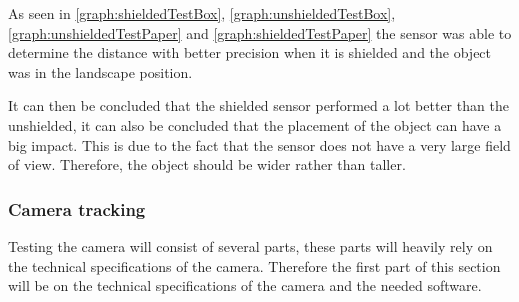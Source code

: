 

As seen in \autoref{graph:shieldedTestBox}, \autoref{graph:unshieldedTestBox},
\autoref{graph:unshieldedTestPaper} and \autoref{graph:shieldedTestPaper} the
sensor was able to determine the distance with better precision when it is
shielded and the object was in the landscape position. \nl

It can then be concluded that the shielded sensor performed a lot better than
the unshielded, it can also be concluded that the placement of the object can
have a big impact. This is due to the fact that the sensor does not have a very
large field of view. Therefore, the object should be wider rather than taller. 

% 
% 

\subsubsection{Camera tracking}%
Testing the camera will consist of several parts, these parts will heavily rely
on the technical specifications of the camera. Therefore the first part of this
section will be on the technical specifications of the camera and the needed
software.\nl

